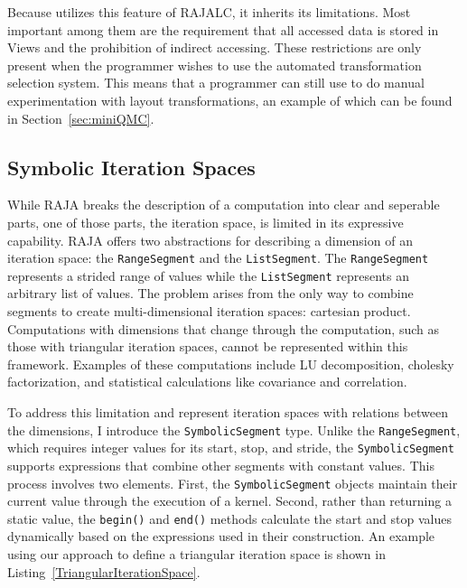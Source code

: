 Because \FormatDecisions{} utilizes this feature of RAJALC, it inherits its limitations.
Most important among them are the requirement that all accessed data is stored in Views and the prohibition of indirect accessing.
These restrictions are only present when the programmer wishes to use the automated transformation selection system. 
This means that a programmer can still use \FormatDecisions{} to do manual experimentation with layout transformations, an example of which can be found in Section~\ref{sec:miniQMC}.

\subsection{Symbolic Iteration Spaces}\label{sec:SymbolicSegment}
While RAJA breaks the description of a computation into clear and seperable parts, one of those parts, the iteration space, is limited in its expressive capability.
RAJA offers two abstractions for describing a dimension of an iteration space: the \verb.RangeSegment. and the \verb.ListSegment..
The \verb.RangeSegment. represents a strided range of values while the \verb.ListSegment. represents an arbitrary list of values.
The problem arises from the only way to combine segments to create multi-dimensional iteration spaces: cartesian product.
Computations with dimensions that change through the computation, such as those with triangular iteration spaces, cannot be represented within this framework.
Examples of these computations include LU decomposition, cholesky factorization, and statistical calculations like covariance and correlation.


To address this limitation and represent iteration spaces with relations between the dimensions, I introduce the \verb.SymbolicSegment. type. 
Unlike the \verb.RangeSegment., which requires integer values for its start, stop, and stride, the \verb.SymbolicSegment. supports expressions that combine other segments with constant values. 
This process involves two elements.
First, the \verb.SymbolicSegment. objects maintain their current value through the execution of a kernel. 
Second, rather than returning a static value, the \verb.begin(). and \verb.end(). methods calculate the start and stop values dynamically based on the expressions used in their construction. 
An example using our approach to define a triangular iteration space is shown in Listing~\ref{TriangularIterationSpace}.

